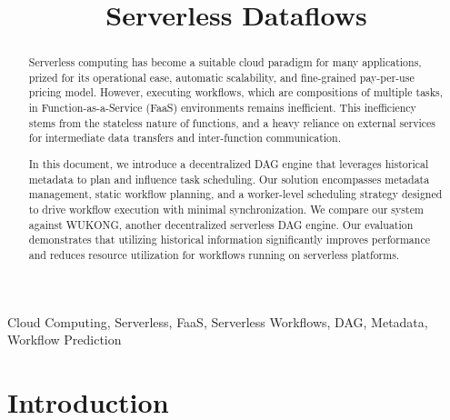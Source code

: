 \documentclass[conference]{IEEEtran}
\begin{document}
\title{Serverless Dataflows}

\author{
}
\maketitle

\begin{abstract}
Serverless computing has become a suitable cloud paradigm for many applications, prized for its operational ease, automatic scalability, and fine-grained pay-per-use pricing model. However, executing workflows, which are compositions of multiple tasks, in Function-as-a-Service (FaaS) environments remains inefficient. This inefficiency stems from the stateless nature of functions, and a heavy reliance on external services for intermediate data transfers and inter-function communication.

In this document, we introduce a decentralized DAG engine that leverages historical metadata to plan and influence task scheduling. Our solution encompasses metadata management, static workflow planning, and a worker-level scheduling strategy designed to drive workflow execution with minimal synchronization. We compare our system against WUKONG, another decentralized serverless DAG engine. Our evaluation demonstrates that utilizing historical information significantly improves performance and reduces resource utilization for workflows running on serverless platforms.
\end{abstract}

\begin{IEEEkeywords}
Cloud Computing, Serverless, FaaS, Serverless Workflows, DAG, Metadata, Workflow Prediction
\end{IEEEkeywords}

\section{Introduction}
\label{s:introduction}
\end{document}
